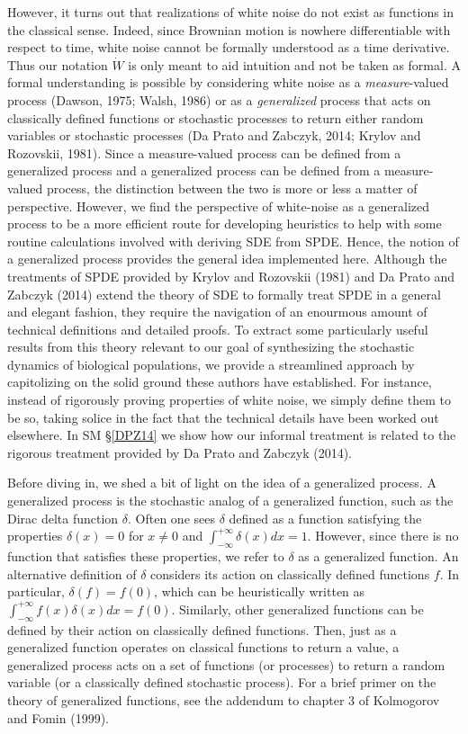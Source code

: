\documentclass[]{elsarticle} %
\begin{document}
However, it turns out that realizations of white noise do not exist as
functions in the classical sense. Indeed, since Brownian motion is
nowhere differentiable with respect to time, white noise cannot be
formally understood as a time derivative. Thus our notation \(\dot W\)
is only meant to aid intuition and not be taken as formal. A formal
understanding is possible by considering white noise as a
\emph{measure}-valued process (Dawson, 1975; Walsh, 1986) or as a
\emph{generalized} process that acts on classically defined functions or
stochastic processes to return either random variables or stochastic
processes (Da Prato and Zabczyk, 2014; Krylov and Rozovskii, 1981).
Since a measure-valued process can be defined from a generalized process
and a generalized process can be defined from a measure-valued process,
the distinction between the two is more or less a matter of perspective.
However, we find the perspective of white-noise as a generalized process
to be a more efficient route for developing heuristics to help with some
routine calculations involved with deriving SDE from SPDE. Hence, the
notion of a generalized process provides the general idea implemented
here. Although the treatments of SPDE provided by Krylov and Rozovskii
(1981) and Da Prato and Zabczyk (2014) extend the theory of SDE to
formally treat SPDE in a general and elegant fashion, they require the
navigation of an enourmous amount of technical definitions and detailed
proofs. To extract some particularly useful results from this theory
relevant to our goal of synthesizing the stochastic dynamics of
biological populations, we provide a streamlined approach by
capitolizing on the solid ground these authors have established. For
instance, instead of rigorously proving properties of white noise, we
simply define them to be so, taking solice in the fact that the
technical details have been worked out elsewhere. In SM \S\ref{DPZ14} we
show how our informal treatment is related to the rigorous treatment
provided by Da Prato and Zabczyk (2014).

Before diving in, we shed a bit of light on the idea of a generalized
process. A generalized process is the stochastic analog of a generalized
function, such as the Dirac delta function \(\delta\). Often one sees
\(\delta\) defined as a function satisfying the properties
\(\delta(x)=0\) for \(x\neq0\) and
\(\int_{-\infty}^{+\infty}\delta(x)dx=1\). However, since there is no
function that satisfies these properties, we refer to \(\delta\) as a
generalized function. An alternative definition of \(\delta\) considers
its action on classically defined functions \(f\). In particular,
\(\delta(f)=f(0)\), which can be heuristically written as
\(\int_{-\infty}^{+\infty}f(x)\delta(x)dx=f(0)\). Similarly, other
generalized functions can be defined by their action on classically
defined functions. Then, just as a generalized function operates on
classical functions to return a value, a generalized process acts on a
set of functions (or processes) to return a random variable (or a
classically defined stochastic process). For a brief primer on the
theory of generalized functions, see the addendum to chapter 3 of
Kolmogorov and Fomin (1999).
\end{document}
